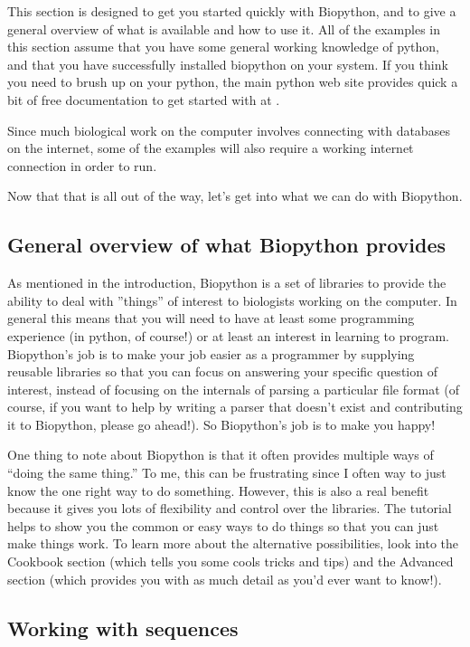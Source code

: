 \documentclass[dvips]{article}
\begin{document}
This section is designed to get you started quickly with Biopython, and to give a general overview of what is available and how to use it. All of the examples in this section assume that you have some general working knowledge of python, and that you have successfully installed biopython on your system. If you think you need to brush up on your python, the main python web site provides quick a bit of free documentation to get started with at . 


Since much biological work on the computer involves connecting with databases on the internet, some of the examples will also require a working internet connection in order to run. 


Now that that is all out of the way, let's get into what we can do with Biopython.

\subsection{General overview of what Biopython provides}

As mentioned in the introduction, Biopython is a set of libraries to provide the ability to deal with ''things'' of interest to biologists working on the computer. In general this means that you will need to have at least some programming experience (in python, of course!) or at least an interest in learning to program. Biopython's job is to make your job easier as a programmer by supplying reusable libraries so that you can focus on answering your specific question of interest, instead of focusing on the internals of parsing a particular file format (of course, if you want to help by writing a parser that doesn't exist and contributing it to Biopython, please go ahead!). So Biopython's job is to make you happy!


One thing to note about Biopython is that it often provides multiple ways of ``doing the same thing.'' To me, this can be frustrating since I  often way to just know the one right way to do something. However, this is also a real benefit because it gives you lots of flexibility and control over the libraries. The tutorial helps to show you the common or easy ways to do things so that you can just make things work. To learn more about the alternative possibilities, look into the Cookbook section (which tells you some cools tricks and tips) and the Advanced section (which provides you with as much detail as you'd ever want to know!). 

\subsection{Working with sequences}
\end{document}

